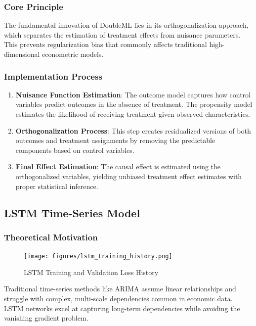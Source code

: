 \subsubsection{Core Principle}
The fundamental innovation of DoubleML lies in its orthogonalization approach, which separates the estimation of treatment effects from nuisance parameters. This prevents regularization bias that commonly affects traditional high-dimensional econometric models.

\subsubsection{Implementation Process}
\begin{enumerate}
    \item \textbf{Nuisance Function Estimation}: The outcome model captures how control variables predict outcomes in the absence of treatment. The propensity model estimates the likelihood of receiving treatment given observed characteristics.
    \item \textbf{Orthogonalization Process}: This step creates residualized versions of both outcomes and treatment assignments by removing the predictable components based on control variables.
    \item \textbf{Final Effect Estimation}: The causal effect is estimated using the orthogonalized variables, yielding unbiased treatment effect estimates with proper statistical inference.
\end{enumerate}


\subsection{LSTM Time-Series Model}\label{subsec:lstm}



\subsubsection{Theoretical Motivation}
\begin{figure}[H]
    \centering
    \texttt{[image: figures/lstm\_training\_history.png]}
    \caption{LSTM Training and Validation Loss History}
    \label{fig:lstm_training_history}
\end{figure}

Traditional time-series methods like ARIMA assume linear relationships and struggle with complex, multi-scale dependencies common in economic data. LSTM networks excel at capturing long-term dependencies while avoiding the vanishing gradient problem.

